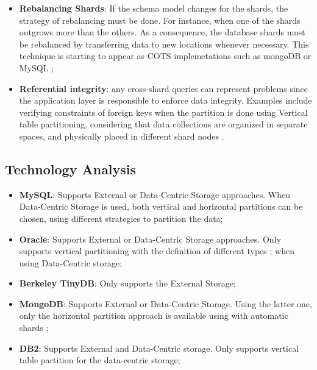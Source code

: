 \begin{itemize}
  \item \textbf{Rebalancing Shards}: If the schema model changes for the
  shards, the strategy of rebalancing must be done. For instance, when one of
  the shards outgrows more than the others. As a consequence, the database
  shards must be rebalanced by transferring data to new locations whenever
  necessary. This technique is starting to appear as COTS implemetations such
  as mongoDB \cite{mongodb} or MySQL \cite{mysql};
  \item \textbf{Referential integrity}: any cross-shard queries can represent
  problems since the application layer is responsible to enforce data
  integrity. Examples include verifying constraints of foreign keys when the
  partition is done using Vertical table partitioning, considering that data
  collections are organized in separate spaces, and physically placed in
  different shard nodes \cite{db-table-partition}.
\end{itemize}

\subsection{Technology Analysis}

\begin{itemize}
  \item \textbf{MySQL}: Supports External or Data-Centric Storage approaches.
  When Data-Centric Storage is used, both vertical and horizontal partitions
  \cite{db-partitioning-relational} can be chosen, using different strategies to
  partition the data;
  \item \textbf{Oracle}: Supports External or Data-Centric Storage
  approaches. Only supports vertical partitioning with the definition
  of different types \cite{db-table-partition};
  \cite{db-partitioning-relational-oracle} when using Data-Centric storage;
  \item \textbf{Berkeley TinyDB}: Only supports the External Storage;
  \item \textbf{MongoDB}: Supports External or Data-Centric Storage.
  Using the latter one, only the horizontal partition approach is available
  using with automatic shards \cite{db-mongo-partition};
  \item \textbf{DB2}: Supports External and Data-Centric storage. Only supports
  vertical table partition \cite{db-db2-partition} for the data-centric storage;
\end{itemize}

